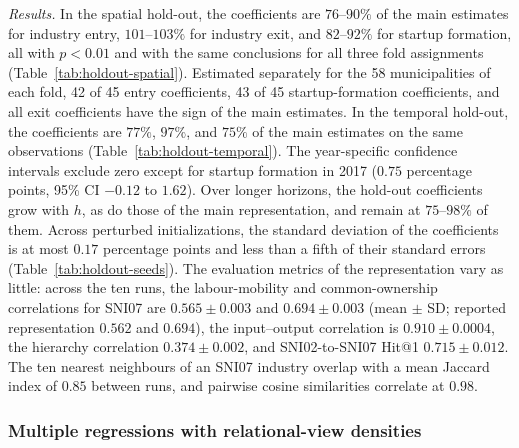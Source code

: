 \documentclass[9pt,twoside]{pnas-new}
\begin{document}
\textit{Results.} In the spatial hold-out, the coefficients are $76$--$90\%$ of the main estimates for industry entry, $101$--$103\%$ for industry exit, and $82$--$92\%$ for startup formation, all with $p<0.01$ and with the same conclusions for all three fold assignments (Table~\ref{tab:holdout-spatial}). Estimated separately for the 58 municipalities of each fold, 42 of 45 entry coefficients, 43 of 45 startup-formation coefficients, and all exit coefficients have the sign of the main estimates. In the temporal hold-out, the coefficients are $77\%$, $97\%$, and $75\%$ of the main estimates on the same observations (Table~\ref{tab:holdout-temporal}). The year-specific confidence intervals exclude zero except for startup formation in 2017 ($0.75$ percentage points, 95\% CI $-0.12$ to $1.62$). Over longer horizons, the hold-out coefficients grow with $h$, as do those of the main representation, and remain at $75$--$98\%$ of them. Across perturbed initializations, the standard deviation of the coefficients is at most $0.17$ percentage points and less than a fifth of their standard errors (Table~\ref{tab:holdout-seeds}). The evaluation metrics of the representation vary as little: across the ten runs, the labour-mobility and common-ownership correlations for SNI07 are $0.565\pm0.003$ and $0.694\pm0.003$ (mean $\pm$ SD; reported representation $0.562$ and $0.694$), the input--output correlation is $0.910\pm0.0004$, the hierarchy correlation $0.374\pm0.002$, and SNI02-to-SNI07 Hit@1 $0.715\pm0.012$. The ten nearest neighbours of an SNI07 industry overlap with a mean Jaccard index of $0.85$ between runs, and pairwise cosine similarities correlate at $0.98$.

\subsubsection{Multiple regressions with relational-view densities}
\label{subsubsec:multiple-regression}
\end{document}
